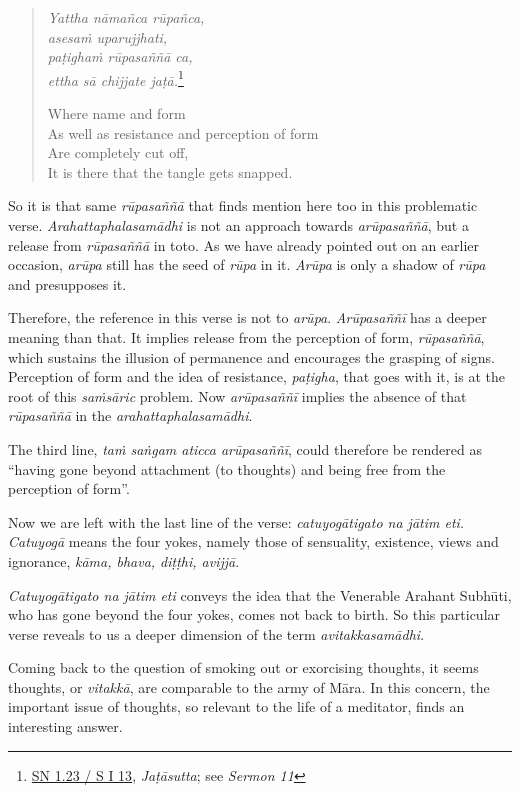\begin{quote}
\emph{Yattha nāmañca rūpañca,}\\
\emph{asesaṁ uparujjhati,}\\
\emph{paṭighaṁ rūpasaññā ca,}\\
\emph{ettha sā chijjate jaṭā.}\footnote{\href{https://suttacentral.net/sn1.23/pli/ms}{SN 1.23 / S I 13}, \emph{Jaṭāsutta}; see \emph{Sermon 11}}

Where name and form\\
As well as resistance and perception of form\\
Are completely cut off,\\
It is there that the tangle gets snapped.
\end{quote}

So it is that same \emph{rūpasaññā} that finds mention here too in this problematic verse. \emph{Arahattaphalasamādhi} is not an approach towards \emph{arūpasaññā}, but a release from \emph{rūpasaññā} in toto. As we have already pointed out on an earlier occasion, \emph{arūpa} still has the seed of \emph{rūpa} in it. \emph{Arūpa} is only a shadow of \emph{rūpa} and presupposes it.

Therefore, the reference in this verse is not to \emph{arūpa}. \emph{Arūpasaññī} has a deeper meaning than that. It implies release from the perception of form, \emph{rūpasaññā}, which sustains the illusion of permanence and encourages the grasping of signs. Perception of form and the idea of resistance, \emph{paṭigha}, that goes with it, is at the root of this \emph{saṁsāric} problem. Now \emph{arūpasaññī} implies the absence of that \emph{rūpasaññā} in the \emph{arahattaphalasamādhi}.

The third line, \emph{taṁ saṅgam aticca arūpasaññī}, could therefore be rendered as ``having gone beyond attachment (to thoughts) and being free from the perception of form''.

Now we are left with the last line of the verse: \emph{catuyogātigato na jātim eti.} \emph{Catuyogā} means the four yokes, namely those of sensuality, existence, views and ignorance, \emph{kāma, bhava, diṭṭhi, avijjā}.

\emph{Catuyogātigato na jātim eti} conveys the idea that the Venerable Arahant Subhūti, who has gone beyond the four yokes, comes not back to birth. So this particular verse reveals to us a deeper dimension of the term \emph{avitakkasamādhi}.

Coming back to the question of smoking out or exorcising thoughts, it seems thoughts, or \emph{vitakkā}, are comparable to the army of Māra. In this concern, the important issue of thoughts, so relevant to the life of a meditator, finds an interesting answer.

